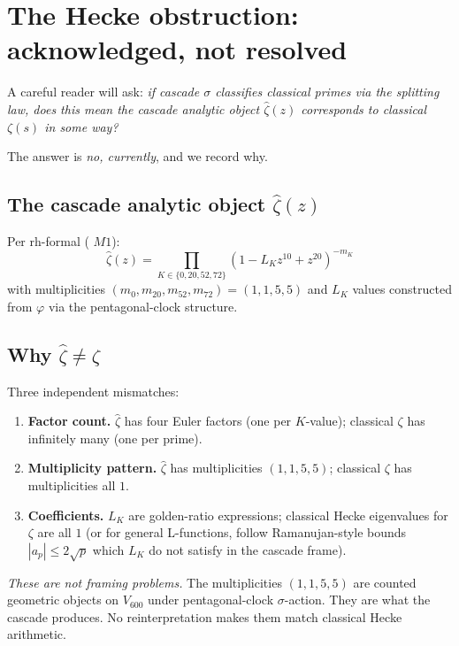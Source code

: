 \documentclass[11pt,a4paper]{article}
\theoremstyle{definition}
\theoremstyle{remark}
\begin{document}
\section{The Hecke obstruction: acknowledged, not resolved}\label{sec:hecke}

A careful reader will ask: \emph{if cascade $\sigma$ classifies classical
primes via the splitting law, does this mean the cascade analytic object
$\hat{\zeta}(z)$ corresponds to classical $\zeta(s)$ in some way?}

The answer is \emph{no, currently}, and we record why.

\subsection{The cascade analytic object $\hat{\zeta}(z)$}

Per rh-formal (\cite{rhFormalSmart} $M1$):
\[
\hat{\zeta}(z) = \prod_{K \in \{0, 20, 52, 72\}} \left( 1 - L_K z^{10} + z^{20} \right)^{-m_K}
\]
with multiplicities $(m_0, m_{20}, m_{52}, m_{72}) = (1, 1, 5, 5)$ and
$L_K$ values constructed from $\varphi$ via the pentagonal-clock
structure.

\subsection{Why $\hat{\zeta} \neq \zeta$}

Three independent mismatches:

\begin{enumerate}\itemsep0pt
  \item \textbf{Factor count.} $\hat{\zeta}$ has four Euler factors (one per $K$-value); classical $\zeta$ has infinitely many (one per prime).
  \item \textbf{Multiplicity pattern.} $\hat{\zeta}$ has multiplicities $(1, 1, 5, 5)$; classical $\zeta$ has multiplicities all $1$.
  \item \textbf{Coefficients.} $L_K$ are golden-ratio expressions; classical Hecke eigenvalues for $\zeta$ are all $1$ (or for general L-functions, follow Ramanujan-style bounds $|a_p| \le 2\sqrt{p}$ which $L_K$ do not satisfy in the cascade frame).
\end{enumerate}

\emph{These are not framing problems.} The multiplicities $(1, 1, 5, 5)$
are counted geometric objects on $V_{600}$ under pentagonal-clock
$\sigma$-action. They are what the cascade produces. No reinterpretation
makes them match classical Hecke arithmetic.
\end{document}
